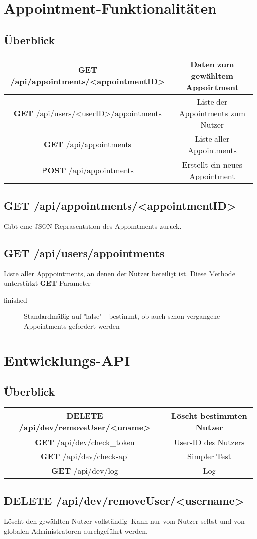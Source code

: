 \documentclass[11pt,a4paper]{article}
\begin{document}
\section{Appointment-Funktionalitäten}
\subsection{Überblick}
\begin{tabular}{|c|c|}
\hline
\textbf{GET} /api/appointments/<appointmentID> & Daten zum gewähltem Appointment \\
\hline
\textbf{GET} /api/users/<userID>/appointments & Liste der Appointments zum Nutzer \\
\hline
\textbf{GET} /api/appointments & Liste aller Appointments \\
\hline
\textbf{POST} /api/appointments & Erstellt ein neues Appointment \\
\hline
\end{tabular}

\subsection{\textbf{GET} /api/appointments/<appointmentID>}
Gibt eine JSON-Repräsentation des Appointments zurück.
\subsection{\textbf{GET} /api/users/appointments}
Liste aller Apppointments, an denen der Nutzer beteiligt ist. Diese Methode unterstützt \textbf{GET}-Parameter
\begin{description}
    \item[finished] Standardmäßig auf "false" - bestimmt, ob auch schon vergangene Appointments gefordert werden
\end{description}
\section{Entwicklungs-API}
\subsection{Überblick}

\begin{tabular}{|c|c|}
\hline
\textbf{DELETE} /api/dev/removeUser/<uname> & Löscht bestimmten Nutzer \\
\hline
\textbf{GET} /api/dev/check\_token & User-ID des Nutzers \\
\hline
\textbf{GET} /api/dev/check-api & Simpler Test \\
\hline
\textbf{GET} /api/dev/log & Log \\
\hline
\end{tabular}

\subsection{\textbf{DELETE} /api/dev/removeUser/<username>}
Löscht den gewählten Nutzer vollständig. Kann nur vom Nutzer selbst und von globalen Administratoren durchgeführt werden.
\end{document}
